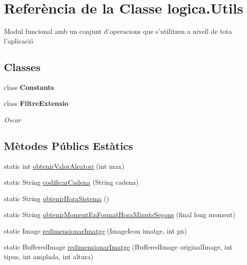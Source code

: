 \hypertarget{classlogica_1_1_utils}{\section{Referència de la Classe logica.\+Utils}
\label{classlogica_1_1_utils}
}


Modul funcional amb un conjunt d'operacions que s'utilitzen a nivell de tota l'aplicació  


\subsection*{Classes}
\begin{DoxyCompactItemize}
\item 
class {\bfseries Constants}
\item 
class {\bfseries Filtre\+Extensio}
\begin{DoxyCompactList}\small\item\em Oscar \end{DoxyCompactList}\end{DoxyCompactItemize}
\subsection*{Mètodes Públics Estàtics}
\begin{DoxyCompactItemize}
\item 
static int \hyperlink{classlogica_1_1_utils_a9b70eb7cd5d0abf2938c68baa3034894}{obtenir\+Valor\+Aleatori} (int max)
\item 
static String \hyperlink{classlogica_1_1_utils_a66b968a61334d9723942ad3a9e621fbd}{codificar\+Cadena} (String cadena)
\item 
static String \hyperlink{classlogica_1_1_utils_aaf9d9b176acc66d9c2e9ba977a22f414}{obtenir\+Hora\+Sistema} ()
\item 
static String \hyperlink{classlogica_1_1_utils_a621092fb3c75d5fc727ed3708ee00f24}{obtenir\+Moment\+En\+Format\+Hora\+Minuts\+Segons} (final long moment)
\item 
static Image \hyperlink{classlogica_1_1_utils_a5c0e404e667ec5f7fdac6a244b224098}{redimensionar\+Imatge} (Image\+Icon imatge, int px)
\item 
static Buffered\+Image \hyperlink{classlogica_1_1_utils_aaf930ea3e64076e1058757013226f044}{redimensionar\+Imatge} (Buffered\+Image original\+Image, int tipus, int amplada, int altura)
\end{DoxyCompactItemize}


